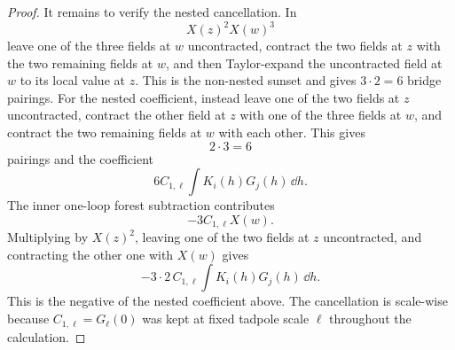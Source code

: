 \begin{proof}
It remains to verify the nested cancellation.  In
\[
  X(z)^2X(w)^3
\]
leave one of the three fields at \(w\) uncontracted, contract the two fields
at \(z\) with the two remaining fields at \(w\), and then Taylor-expand the
uncontracted field at \(w\) to its local value at \(z\).  This is the
non-nested sunset and gives \(3\cdot2=6\) bridge pairings.  For the nested
coefficient, instead leave one of the two fields at \(z\) uncontracted,
contract the other field at \(z\) with one of the three fields at \(w\), and
contract the two remaining fields at \(w\) with each other.  This gives
\[
  2\cdot3=6
\]
pairings and the coefficient
\[
  6C_{1,\ell}\int K_i(h)G_j(h)\,\dd h .
\]
The inner one-loop forest subtraction contributes
\[
  -3C_{1,\ell}X(w).
\]
Multiplying by \(X(z)^2\), leaving one of the two fields at \(z\)
uncontracted, and contracting the other one with \(X(w)\) gives
\[
  -3\cdot2\,C_{1,\ell}\int K_i(h)G_j(h)\,\dd h .
\]
This is the negative of the nested coefficient above.  The cancellation is
scale-wise because \(C_{1,\ell}=G_\ell(0)\) was kept at fixed tadpole scale
\(\ell\) throughout the calculation.
\end{proof}

